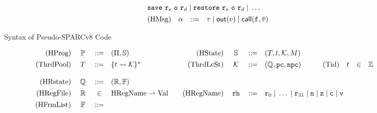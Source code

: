 \begin{figure*}[!t]
\[\begin{array}{rcclcrccl}
            \multicolumn{6}{l}
            {
                \csave{} \ \reg{s} \ \oexp \ \reg{d} \sepline 
                \crestore{} \ \reg{s} \ \oexp \ \reg{d} \sepline
                \dots
            } 
            \\
            \\[-8pt]
            \TYPE{(HMsg)} & \hmsg & \define & \empmsg \sepline \outEvt{\val} \sepline 
            \callEvt{\lab{}, \args{\val}} 
        \end{array}
    \]
    \vspace{-1em}
    \caption{Syntax of Pseudo-SPARCv8 Code}
    \label{fig:syntax-of-concur-pseudo-sparc}
    \vspace{-1em}
\end{figure*}
\begin{figure*}[!t]
    \centering
    \small
    \[
        \begin{array}{rcclrcclrccl}
            \TYPE{(HProg)} & \ \HProg \ & \define & 
            (\HMd, \hpstate) &
            \TYPE{(HState)} & \hpstate & \define & 
            \multicolumn{3}{l}
            {
                (\thrdpool, \thrdid, \hthrdlocalst, \Mem)
            }
            \\
            \\[-8pt]
            \TYPE{(ThrdPool)} & \thrdpool & \define & 
            \{ \thrdid \rightsquigarrow \hthrdlocalst \}^{*}
            & \ \ 
            \TYPE{(ThrdLcSt)} & \ \hthrdlocalst \ & \define & 
            (\hRstate, \pc, \npc) 
            & \qquad
            \TYPE{(Tid)} & \thrdid & \in & \Ztype \\
            \\
            \TYPE{(HRstate)} & \hRstate & \define & 
            (\hRfile, \hWstk) \\
            \\[-8pt]
            \TYPE{(HRegFile)} & \hRfile & \in & 
            \TYPE{HRegName} \rightharpoonup \TYPE{Val} 
            & \quad
            \TYPE{(HRegName)} & \hrn & \define & 
            \multicolumn{5}{l}
            {
                \reg{0} \sepline \dots \sepline \reg{31} \sepline 
                \regn \sepline \regz \sepline \regc \sepline \regv
            } \\
            \\[-8pt]
            \TYPE{(HFrmList)} & \hWstk & \define & 

\end{array}\]
\end{figure*}
